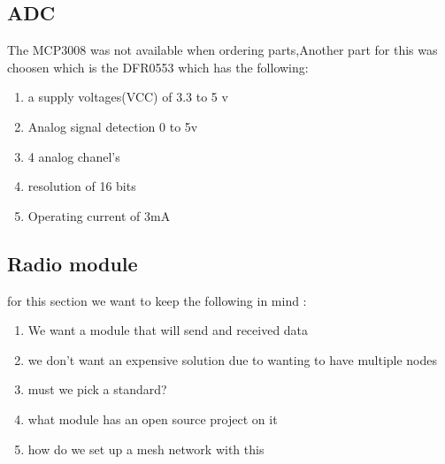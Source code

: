 \subsection{ADC}
The MCP3008 was not  available when ordering parts,Another  part for this was choosen which is the  DFR0553 which has the following:
\begin{enumerate}
    \item a supply voltages(VCC) of 3.3 to 5 v
    \item Analog signal  detection 0 to 5v
    \item 4 analog chanel's
    \item resolution of 16 bits
    \item Operating current of 3mA
\end{enumerate}
\subsection{Radio module}
for  this  section we want  to keep  the following in mind :
\begin{enumerate}
    \item We want a module that will send  and  received data
    \item we don't  want  an  expensive solution due  to wanting to  have  multiple nodes
    \item must we pick a standard? 
    \item what module has  an open source project on it 
    \item how do we  set up  a   mesh network with this 
\end{enumerate}
